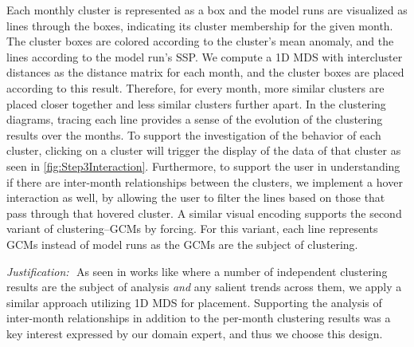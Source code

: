 Each monthly cluster is represented as a box and the model runs are visualized as lines through the boxes, indicating its cluster membership for the given month.
%
The cluster boxes are colored according to the cluster's mean anomaly, and the lines according to the model run's SSP.
%
We compute a 1D MDS with intercluster distances as the distance matrix for each month, and the cluster boxes are placed according to this result.
%
Therefore, for every month, more similar clusters are placed closer together and less similar clusters further apart. 
%
In the clustering diagrams, tracing each line provides a sense of the evolution of the clustering results over the months.
%
To support the investigation of the behavior of each cluster, clicking on a cluster will trigger the display of the data of that cluster as seen in \cref{fig:Step3Interaction}. 
%
Furthermore, to support the user in understanding if there are inter-month relationships between the clusters, we implement a hover interaction as well, by allowing the user to filter the lines based on those that pass through that hovered cluster.
%
A similar visual encoding supports the second variant of clustering--GCMs by forcing.
%
For this variant, each line represents GCMs instead of model runs as the GCMs are the subject of clustering.




\noindent
\quad\textit{Justification:}\,\, As seen in works like \cite{jackle2016temporal} where a number of independent clustering results are the subject of analysis \textit{and} any salient trends across them, we apply a similar approach utilizing 1D MDS for placement.
%
Supporting the analysis of inter-month relationships in addition to the per-month clustering results was a key interest expressed by our domain expert, and thus we choose this design. 





